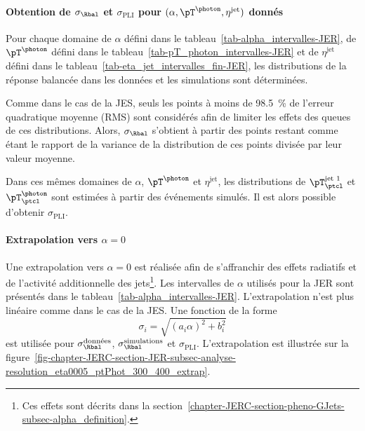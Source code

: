 \paragraph{Obtention de $\sigma_\Rbal$ et $\sigma_\text{PLI}$ pour $(\alpha, \pT^{\photon}, \eta^\text{jet})$ donnés}
Pour chaque domaine
de $\alpha$ défini dans le tableau~\ref{tab-alpha_intervalles-JER},
de $\pT^{\photon}$ défini dans le tableau~\ref{tab-pT_photon_intervalles-JER} et
de $\eta^\text{jet}$ défini dans le tableau~\ref{tab-eta_jet_intervalles_fin-JER},
les distributions de la réponse balancée dans les données et les simulations sont déterminées.
\par Comme dans le cas de la JES, seuls les points à moins de \SI{98.5}{\%} de l'erreur quadratique moyenne (RMS) sont considérés afin de limiter les effets des queues de ces distributions.
Alors, $\sigma_{\Rbal}$ s'obtient à partir des points restant comme étant le rapport de la variance de la distribution de ces points divisée par leur valeur moyenne.
\par
Dans ces mêmes domaines de $\alpha$, $\pT^{\photon}$ et $\eta^\text{jet}$, les distributions de $\pT^\text{jet 1}_\ptcl$ et $\pT^{\photon}_\ptcl$ sont estimées à partir des événements simulés.
Il est alors possible d'obtenir $\sigma_\text{PLI}$.
\paragraph{Extrapolation vers $\alpha=0$}
Une extrapolation vers $\alpha=0$ est réalisée afin de s'affranchir des effets radiatifs et de l'activité additionnelle des jets\footnote{Ces effets sont décrits dans la section~\ref{chapter-JERC-section-pheno-GJets-subsec-alpha_definition}.}.
Les intervalles de $\alpha$ utilisés pour la JER sont présentés dans le tableau~\ref{tab-alpha_intervalles-JER}.
L'extrapolation n'est plus linéaire comme dans le cas de la JES.
Une fonction de la forme
\begin{equation}
\sigma_i = \sqrt{(a_i\alpha)^2+b_i^2}
\end{equation}
est utilisée pour $\sigma_\Rbal^\text{données}$, $\sigma_\Rbal^\text{simulations}$ et $\sigma_\text{PLI}$.
L'extrapolation est illustrée sur la figure~\ref{fig-chapter-JERC-section-JER-subsec-analyse-resolution_eta0005_ptPhot_300_400_extrap}.
